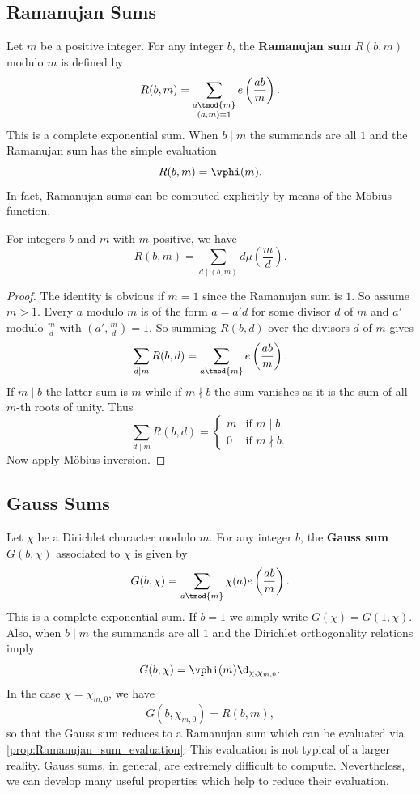 \documentclass[12pt]{article}
\begin{document}
    \subsection{Ramanujan Sums}
      Let \(m\) be a positive integer. For any integer \(b\), the \textbf{Ramanujan sum} \(R(b,m)\) modulo \(m\) is defined by
      \[
        R(b,m) = \sum_{\substack{a \tmod{m} \\ (a,m) = 1}}e\left(\frac{ab}{m}\right).
      \]
      This is a complete exponential sum. When \(b \mid m\) the summands are all \(1\) and the Ramanujan sum has the simple evaluation
      \[
        R(b,m) = \vphi(m).
      \]
      In fact, Ramanujan sums can be computed explicitly by means of the M\"obius function.

      \begin{proposition}\label{prop:Ramanujan_sum_evaluation}
        For integers \(b\) and \(m\) with \(m\) positive, we have
        \[
          R(b,m) = \sum_{d \mid (b,m)}d\mu\left(\frac{m}{d}\right).
        \]
      \end{proposition}
      \begin{proof}
        The identity is obvious if \(m = 1\) since the Ramanujan sum is \(1\). So assume \(m > 1\). Every \(a\) modulo \(m\) is of the form \(a = a'd\) for some divisor \(d\) of \(m\) and \(a'\) modulo \(\frac{m}{d}\) with \(\left(a',\frac{m}{d}\right) = 1\). So summing \(R(b,d)\) over the divisors \(d\) of \(m\) gives
        \[
          \sum_{d \mid m}R(b,d) = \sum_{a \tmod{m}}e\left(\frac{ab}{m}\right).
        \]
        If \(m \mid b\) the latter sum is \(m\) while if \(m \nmid b\) the sum vanishes as it is the sum of all \(m\)-th roots of unity. Thus
        \[
          \sum_{d \mid m}R(b,d) = \begin{cases} m & \text{if \(m \mid b\)}, \\ 0 & \text{if \(m \nmid b\)}. \end{cases}
        \]
        Now apply M\"obius inversion.
      \end{proof}
    \subsection{Gauss Sums}
      Let \(\chi\) be a Dirichlet character modulo \(m\). For any integer \(b\), the \textbf{Gauss sum} \(G(b,\chi)\) associated to \(\chi\) is given by
      \[
        G(b,\chi) = \sum_{a \tmod{m}}\chi(a)e\left(\frac{ab}{m}\right).
      \]
      This is a complete exponential sum. If \(b = 1\) we simply write \(G(\chi) = G(1,\chi)\). Also, when \(b \mid m\) the summands are all \(1\) and the Dirichlet orthogonality relations imply
      \[
        G(b,\chi) = \vphi(m)\d_{\chi,\chi_{m,0}}.
      \]
      In the case \(\chi = \chi_{m,0}\), we have
      \[
        G(b,\chi_{m,0}) = R(b,m),
      \]
      so that the Gauss sum reduces to a Ramanujan sum which can be evaluated via \cref{prop:Ramanujan_sum_evaluation}. This evaluation is not typical of a larger reality. Gauss sums, in general, are extremely difficult to compute. Nevertheless, we can develop many useful properties which help to reduce their evaluation.
\end{document}
